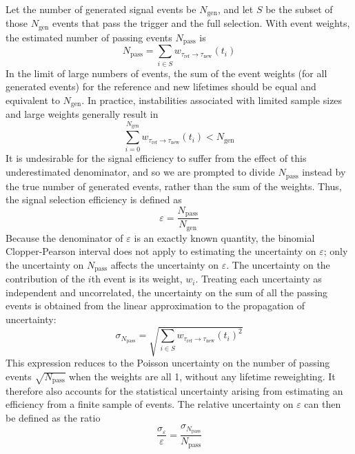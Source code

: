 Let the number of generated signal events be $N_\text{gen}$, and let $S$ be the subset of those $N_\text{gen}$ events that pass the trigger and the full selection.
With event weights, the estimated number of passing events $N_\text{pass}$ is
\begin{equation}
  N_\text{pass} = \sum_{i\in S}{w_{\tau_\text{ref}\to\tau_\text{new}}(t_i)}
  \label{eq:dd:npass}
\end{equation}
In the limit of large numbers of events, the sum of the event weights (for all generated events) for the reference and new lifetimes should be equal and equivalent to $N_\text{gen}$.
In practice, instabilities associated with limited sample sizes and large weights generally result in
\begin{equation}
  \sum_{i = 0}^{N_\text{gen}}{w_{\tau_\text{ref}\to\tau_\text{new}}(t_i)} < N_\text{gen}
\end{equation}
It is undesirable for the signal efficiency to suffer from the effect of this underestimated denominator, and so we are prompted to divide $N_\text{pass}$ instead by the true number of generated events, rather than the sum of the weights.
Thus, the signal selection efficiency is defined as
\begin{equation}
  \varepsilon = \frac{N_\text{pass}}{N_\text{gen}}
  \label{eq:dd:signaleff}
\end{equation}
Because the denominator of $\varepsilon$ is an exactly known quantity, the binomial Clopper-Pearson interval does not apply to estimating the uncertainty on $\varepsilon$; only the uncertainty on $N_\text{pass}$ affects the uncertainty on $\varepsilon$.
The uncertainty on the contribution of the $i$th event is its weight, $w_i$.
Treating each uncertainty as independent and uncorrelated, the uncertainty on the sum of all the passing events is obtained from the linear approximation to the propagation of uncertainty:
\begin{equation}
  \sigma_{N_\text{pass}} = \sqrt{\sum_{i\in S}{w_{\tau_\text{ref}\to\tau_\text{new}}(t_i)^2}}
  \label{eq:dd:npassunc}
\end{equation}
This expression reduces to the Poisson uncertainty on the number of passing events $\sqrt{N_\text{pass}}$ when the weights are all 1, \ie without any lifetime reweighting.
It therefore also accounts for the statistical uncertainty arising from estimating an efficiency from a finite sample of events.
The relative uncertainty on $\varepsilon$ can then be defined as the ratio
\begin{equation}
  \frac{\sigma_\varepsilon}{\varepsilon} = \frac{\sigma_{N_\text{pass}}}{N_\text{pass}}
  \label{eq:dd:signaleffunc}
\end{equation}
